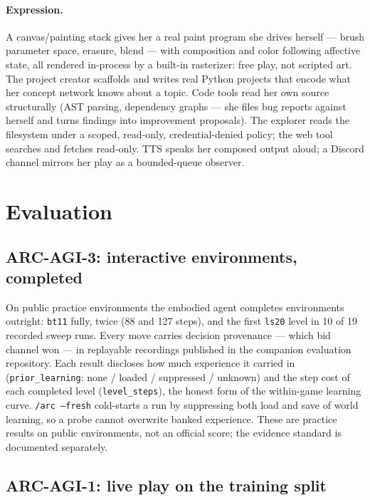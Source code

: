 \documentclass[11pt]{article}
\newcommand{\code}[1]{\texttt{\small #1}}
\begin{document}
\paragraph{Expression.} A canvas/painting stack gives her a real paint
program she drives herself --- brush parameter space, erasure, blend ---
with composition and color following affective state, all rendered
in-process by a built-in rasterizer: free play, not scripted art. The
project creator scaffolds and
writes real Python projects that encode what her concept network knows
about a topic. Code tools read her own source structurally (AST
parsing, dependency graphs --- she files bug reports against herself
and turns findings into improvement proposals). The explorer reads the
filesystem under a scoped, read-only, credential-denied policy; the web
tool searches and fetches read-only. TTS speaks her composed output
aloud; a Discord channel mirrors her play as a bounded-queue observer.

\section{Evaluation}

\subsection{ARC-AGI-3: interactive environments, completed}

On public practice environments the embodied agent completes
environments outright: \texttt{bt11} fully, twice (88 and 127 steps),
and the first \texttt{ls20} level in 10 of 19 recorded sweep runs.
Every move carries decision provenance --- which bid channel won ---
in replayable recordings published in the companion evaluation
repository. Each result discloses how much experience it carried in
(\code{prior\_learning}: none / loaded / suppressed / unknown) and the
step cost of each completed level (\code{level\_steps}), the honest
form of the within-game learning curve. \code{/arc --fresh}
cold-starts a run by suppressing both load
and save of world learning, so a probe cannot overwrite banked
experience. These are practice results on public environments, not an
official score; the evidence standard is documented separately.

\subsection{ARC-AGI-1: live play on the training split}
\end{document}

